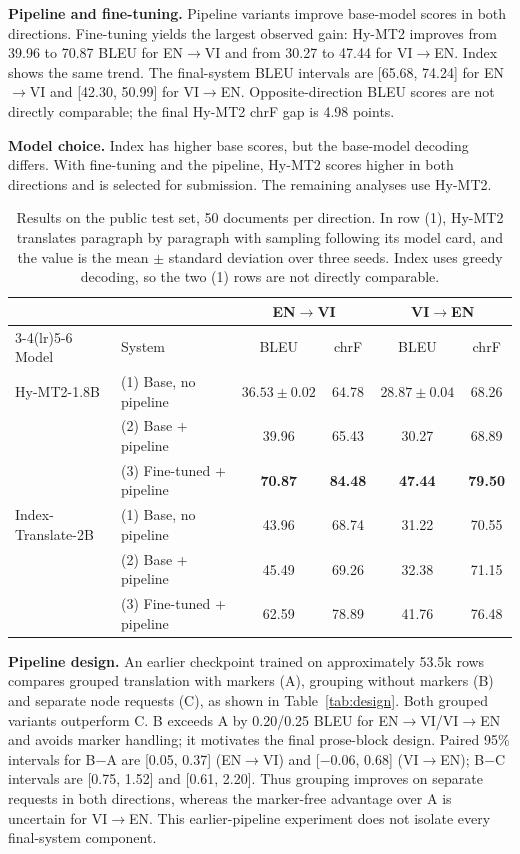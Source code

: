 \documentclass[11pt]{article}
\newcommand{\envi}{EN$\rightarrow$VI}
\newcommand{\vien}{VI$\rightarrow$EN}
\begin{document}
\textbf{Pipeline and fine-tuning.} Pipeline variants improve base-model scores in both directions. Fine-tuning yields the largest observed gain: Hy-MT2 improves from 39.96 to 70.87 BLEU for \envi{} and from 30.27 to 47.44 for \vien{}. Index shows the same trend. The final-system BLEU intervals are [65.68, 74.24] for \envi{} and [42.30, 50.99] for \vien{}. Opposite-direction BLEU scores are not directly comparable; the final Hy-MT2 chrF gap is 4.98 points.

\textbf{Model choice.} Index has higher base scores, but the base-model decoding differs. With fine-tuning and the pipeline, Hy-MT2 scores higher in both directions and is selected for submission. The remaining analyses use Hy-MT2.

\begin{table}[t]
\centering
\begin{tabular}{llcccc}
\toprule
 & & \multicolumn{2}{c}{\envi{}} & \multicolumn{2}{c}{\vien{}} \\
\cmidrule(lr){3-4}\cmidrule(lr){5-6}
Model & System & BLEU & chrF & BLEU & chrF \\
\midrule
Hy-MT2-1.8B & (1) Base, no pipeline & $36.53 \pm 0.02$ & 64.78 & $28.87 \pm 0.04$ & 68.26 \\
 & (2) Base + pipeline & 39.96 & 65.43 & 30.27 & 68.89 \\
 & (3) Fine-tuned + pipeline & \textbf{70.87} & \textbf{84.48} & \textbf{47.44} & \textbf{79.50} \\
\midrule
Index-Translate-2B & (1) Base, no pipeline & 43.96 & 68.74 & 31.22 & 70.55 \\
 & (2) Base + pipeline & 45.49 & 69.26 & 32.38 & 71.15 \\
 & (3) Fine-tuned + pipeline & 62.59 & 78.89 & 41.76 & 76.48 \\
\bottomrule
\end{tabular}
\caption{Results on the public test set, 50 documents per direction. In row (1), Hy-MT2 translates paragraph by paragraph with sampling following its model card, and the value is the mean $\pm$ standard deviation over three seeds. Index uses greedy decoding, so the two (1) rows are not directly comparable.}
\label{tab:main}
\end{table}

\textbf{Pipeline design.} An earlier checkpoint trained on approximately 53.5k rows compares grouped translation with markers (A), grouping without markers (B) and separate node requests (C), as shown in Table~\ref{tab:design}. Both grouped variants outperform C. B exceeds A by 0.20/0.25 BLEU for \envi{}/\vien{} and avoids marker handling; it motivates the final prose-block design. Paired 95\% intervals for B$-$A are [0.05, 0.37] (\envi{}) and [$-$0.06, 0.68] (\vien{}); B$-$C intervals are [0.75, 1.52] and [0.61, 2.20]. Thus grouping improves on separate requests in both directions, whereas the marker-free advantage over A is uncertain for \vien{}. This earlier-pipeline experiment does not isolate every final-system component.
\end{document}
